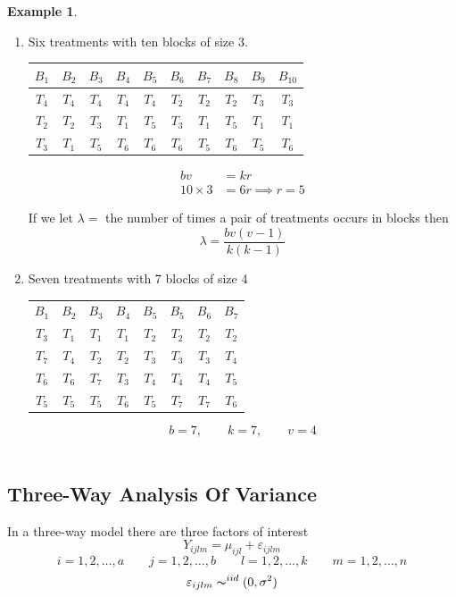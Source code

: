 \documentclass[11pt,a4paper]{article}
\theoremstyle{definition}
\newtheorem{exa}[thm]{Example}
\begin{document}
\begin{exa}
\begin{enumerate}
\item Six treatments with ten blocks of size 3.

\begin{table}[h!]
\centering
\begin{tabular}{|c|c|c|c|c|c|c|c|c|c|}
\hline
$B_1$ & $B_2$ & $B_3$ & $B_4$ & $B_5$ & $B_6$ & $B_7$ & $B_8$ & $B_9$ & $B_{10}$\\
\hline
$T_4$ & $T_4$ & $T_4$ & $T_4$ & $T_4$ & $T_2$ & $T_2$ & $T_2$ & $T_3$ & $T_3$\\
\hline
$T_2$ & $T_2$ & $T_3$ & $T_1$ & $T_5$ & $T_3$ & $T_1$ & $T_5$ & $T_1$ & $T_1$\\
\hline
$T_3$ & $T_1$ & $T_5$ & $T_6$ & $T_6$ & $T_6$ & $T_5$ & $T_6$ & $T_5$ & $T_6$\\
\hline
\end{tabular}
\end{table}

\begin{align*}
bv & = kr\\
10 \times 3 & = 6r \implies r=5
\end{align*}

If we let $\lambda=$ the number of times a pair of treatments occurs in blocks then $$\lambda = \frac{bv(v-1)}{k(k-1)}$$

\item Seven treatments with 7 blocks of size 4

\begin{table}[h!]
\centering
\begin{tabular}{cccccccc}
$B_1$ & $B_2$ & $B_3$ & $B_4$ & $B_5$ & $B_5$ & $B_6$ & $B_7$\\
$T_3$ & $T_1$ & $T_1$ & $T_1$ & $T_2$ & $T_2$ & $T_2$ & $T_2$\\
$T_7$ & $T_4$ & $T_2$ & $T_2$ & $T_3$ & $T_3$ & $T_3$ & $T_4$\\
$T_6$ & $T_6$ & $T_7$ & $T_3$ & $T_4$ & $T_4$ & $T_4$ & $T_5$\\
$T_5$ & $T_5$ & $T_5$ & $T_6$ & $T_5$ & $T_7$ & $T_7$ & $T_6$\\
\end{tabular}
\end{table}
$$b=7,\qquad  k=7,\qquad  v=4$$\\
\end{enumerate}
\end{exa}


\subsection{Three-Way Analysis Of Variance}
In a three-way model there are three factors of interest $$Y_{ijlm}=\mu_{ijl}+\varepsilon_{ijlm}$$
$$i=1,2,\ldots ,a\qquad  j=1,2,\ldots ,b\qquad  l=1,2,\ldots ,k\qquad  m=1,2,\ldots , n$$ $$ \varepsilon_{ijlm}\thicksim^{iid}(0,\sigma^2)$$
\end{document}
